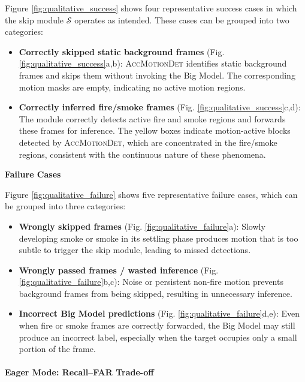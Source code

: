 \documentclass[
  10pt,
]{article}
\begin{document}


Figure \ref{fig:qualitative_success} shows four representative success
cases in which the skip module \(\mathcal{S}\) operates as intended.
These cases can be grouped into two categories:

\begin{itemize}
\item
  \textbf{Correctly skipped static background frames} (Fig.
  \ref{fig:qualitative_success}a,b): \textsc{AccMotionDet} identifies
  static background frames and skips them without invoking the Big
  Model. The corresponding motion masks are empty, indicating no active
  motion regions.
\item
  \textbf{Correctly inferred fire/smoke frames} (Fig.
  \ref{fig:qualitative_success}c,d): The module correctly detects active
  fire and smoke regions and forwards these frames for inference. The
  yellow boxes indicate motion-active blocks detected by
  \textsc{AccMotionDet}, which are concentrated in the fire/smoke
  regions, consistent with the continuous nature of these phenomena.
\end{itemize}

\textbf{Failure Cases}



Figure \ref{fig:qualitative_failure} shows five representative failure
cases, which can be grouped into three categories:

\begin{itemize}
\item
  \textbf{Wrongly skipped frames} (Fig. \ref{fig:qualitative_failure}a):
  Slowly developing smoke or smoke in its settling phase produces motion
  that is too subtle to trigger the skip module, leading to missed
  detections.
\item
  \textbf{Wrongly passed frames / wasted inference} (Fig.
  \ref{fig:qualitative_failure}b,c): Noise or persistent non-fire motion
  prevents background frames from being skipped, resulting in
  unnecessary inference.
\item
  \textbf{Incorrect Big Model predictions} (Fig.
  \ref{fig:qualitative_failure}d,e): Even when fire or smoke frames are
  correctly forwarded, the Big Model may still produce an incorrect
  label, especially when the target occupies only a small portion of the
  frame.
\end{itemize}

\paragraph{Eager Mode: Recall--FAR
Trade-off}\label{eager-mode-recallfar-trade-off}
\end{document}
